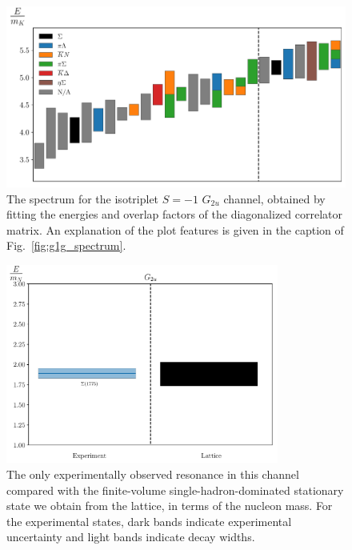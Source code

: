 \begin{figure}[H]
    \centering
    \hspace*{-0.5in}\includegraphics[width=\textwidth]{figures/sigmas/g2u/staircase_mk.pdf}
    \caption[The spectrum for the isotriplet $S=-1$ $G_{2u}$ channel, obtained by fitting the energies and overlap factors of the diagonalized correlator matrix.]{The spectrum for the isotriplet $S=-1$ $G_{2u}$ channel, obtained by fitting the energies and overlap factors of the diagonalized correlator matrix. An explanation of the plot features is given in the caption of Fig.~\ref{fig:g1g_spectrum}.}\label{fig:g2u_spectrum}
\end{figure}

\begin{figure}[H]
    \centering
    \includegraphics[width=0.8\textwidth]{figures/sigmas/g2u/expvslat.pdf}
    \caption[The only experimentally observed resonance in this channel compared with the finite-volume single-hadron-dominated stationary state we obtain from the lattice, in terms of the nucleon mass.]{The only experimentally observed resonance in this channel compared with the finite-volume single-hadron-dominated stationary state we obtain from the lattice, in terms of the nucleon mass. For the experimental states, dark bands indicate experimental uncertainty and light bands indicate decay widths.}\label{fig:g2u_exp}
\end{figure}

